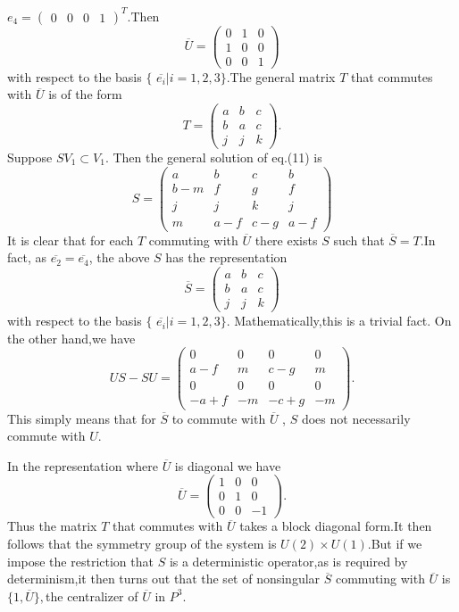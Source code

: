 \documentclass[a4paper,12pt]{article}
\begin{document}
$e_4=\left(
\begin{array}{cccc}
0 & 0 & 0 & 1
\end{array}
\right) ^T.$Then
\[
\overline{U}=\left(
\begin{array}{ccc}
0 & 1 & 0 \\
1 & 0 & 0 \\
0 & 0 & 1
\end{array}
\right)
\]
with respect to the basis $\{$ $\overline{e_i}|i=1,2,3\}.$The general matrix
$T$ that commutes with $\overline{U}$ is of the form
\[
T=\left(
\begin{array}{ccc}
a & b & c \\
b & a & c \\
j & j & k
\end{array}
\right) .
\]
Suppose $SV_1\subset V_1.$ Then the general solution of eq.(11) is
\[
S=\left(
\begin{array}{cccc}
a & b & c & b \\
b-m & f & g & f \\
j & j & k & j \\
m & a-f & c-g & a-f
\end{array}
\right)
\]
It is clear that for each $T$ commuting with $\overline{U}$ there exists $S$
such that $\overline{S}=T.$In fact, as $\overline{e_2}=\overline{e_4}$, the
above $S$ has the representation
\begin{equation}
\overline{S}=\left(
\begin{array}{ccc}
a & b & c \\
b & a & c \\
j & j & k
\end{array}
\right)
\end{equation}
with respect to the basis $\{$ $\overline{e_i}|i=1,2,3\}.$
Mathematically,this is a trivial fact. On the other hand,we have
\[
US-SU=\left(
\begin{array}{cccc}
0 & 0 & 0 & 0 \\
a-f & m & c-g & m \\
0 & 0 & 0 & 0 \\
-a+f & -m & -c+g & -m
\end{array}
\right) .
\]
This simply means that for $\overline{S}$ to commute with $\overline{U}$ , $%
S $ does not necessarily commute with $U.$

In the representation where $\overline{U}$ is diagonal we have
\[
\overline{U}=\left(
\begin{array}{ccc}
1 & 0 & 0 \\
0 & 1 & 0 \\
0 & 0 & -1
\end{array}
\right).
\]
Thus the matrix $T$ that commutes with $\overline{U}$ takes a block diagonal
form.It then follows that the symmetry group of the system is $U(2)\times
U(1)$.But if we impose the restriction that $S$ is a deterministic
operator,as is required by determinism,it then turns out that the set of
nonsingular $\overline{S}$ commuting with $\overline{U}$ is $\{1,\overline{U}%
\},$the centralizer of $\overline{U}$ in $P^3.$
\end{document}
